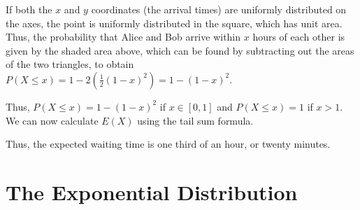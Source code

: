 \begin{examp}
\par
\noindent \noindent  If both the $x$ and $y$ coordinates (the arrival times) are uniformly distributed on the axes, the point is uniformly distributed in the square, which has unit area. Thus, the probability that Alice and Bob arrive within $x$ hours of each other is given by the shaded area above, which can be found by subtracting out the areas of the two triangles, to obtain $P(X \leq x) = 1 - 2(\textstyle\frac{1}{2}(1-x)^2) = 1 - (1-x)^2.$
\par
\noindent Thus, $P(X \leq x) = 1 - (1-x)^2$ if $x \in [0,1]$ and $P(X \leq x) = 1$ if $x> 1$. We can now calculate $E(X)$ using the tail sum formula.
\par
\noindent Thus, the expected waiting time is one third of an hour, or twenty minutes.

\end{examp}

\section{The Exponential Distribution}

